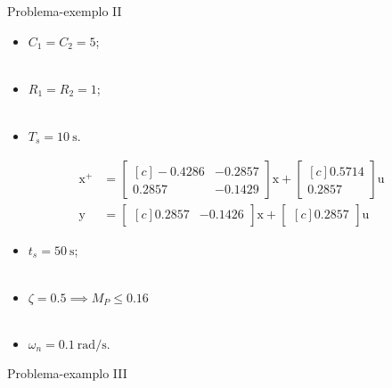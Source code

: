 \documentclass[aspectratio=169,11pt,t,xcolor={usenames,dvipsnames,x11names}]{beamer}
\begin{document}
\begin{frame}{Problema-exemplo II}
	\begin{itemize}
		\item $C_1 = C_2 = 5$;\\~\\
		\item $R_1 = R_2 = 1$;\\~\\
		\item $T_s = \SI{10}{\second}$.
	\end{itemize}\pause
	\begin{subequations}
  \begin{align}
    \pmb{\mathrm{x^{+}}} &= \begin{bmatrix*}[c]
      -0.4286 & -0.2857\\
      0.2857 & -0.1429
    \end{bmatrix*}\pmb{\mathrm{x}} + \begin{bmatrix*}[c]
      0.5714\\
      0.2857
    \end{bmatrix*}\pmb{\mathrm{u}}\label{eq:SSDTCEntrada}\\
    \pmb{\mathrm{y}} &= \begin{bmatrix*}[c]
      0.2857 & -0.1426
    \end{bmatrix*}\pmb{\mathrm{x}} + \begin{bmatrix*}[c]
      0.2857
    \end{bmatrix*}\pmb{\mathrm{u}}\label{eq:SSDTCSaida}
  \end{align}
\end{subequations}
	\pause
	\begin{itemize}
		\item $t_s = \SI{50}{\second}$;\\~\\
		\item $\zeta = 0.5 \implies M_P \leq 0.16$\\~\\
		\item $\omega_n = \SI{0.1}{\radian/\second}$.
	\end{itemize}
\end{frame}

\begin{frame}[c]{Problema-examplo III}
	\begin{figure}[!ht]
  \centering
  \begin{subfigure}[t]{0.3\columnwidth}
    
  \end{subfigure}
  \begin{subfigure}[t]{0.3\columnwidth}
    
  \end{subfigure}
  \begin{subfigure}[t]{0.3\columnwidth}
    
  \end{subfigure}
	\end{figure}
\end{frame}
\end{document}
